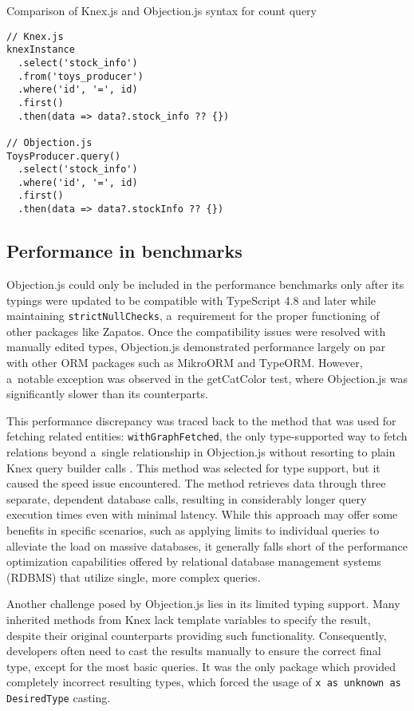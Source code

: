 \begin{listing}
\caption{Comparison of Knex.js and Objection.js syntax for count query}
\label{lst:knexObjection}
\begin{verbatim}
// Knex.js
knexInstance
  .select('stock_info')
  .from('toys_producer')
  .where('id', '=', id)
  .first()
  .then(data => data?.stock_info ?? {})

// Objection.js
ToysProducer.query()
  .select('stock_info')
  .where('id', '=', id)
  .first()
  .then(data => data?.stockInfo ?? {})
\end{verbatim}
\end{listing}

\subsection*{Performance in benchmarks}

Objection.js could only be included in the performance benchmarks only after its
typings were updated to be compatible with TypeScript 4.8 and later while
maintaining \texttt{strictNullChecks}, a~requirement for the proper functioning
of other packages like Zapatos. Once the compatibility issues were resolved with
manually edited types, Objection.js demonstrated performance largely on par with
other ORM packages such as MikroORM and TypeORM. However, a~notable exception
was observed in the getCatColor test, where Objection.js was significantly
slower than its counterparts.

\newpage

This performance discrepancy was traced back to the method that was used for
fetching related entities: \texttt{withGraphFetched}, the only type-supported
way to fetch relations beyond a~single relationship in Objection.js without
resorting to plain Knex query builder calls \cite{objectionDocs}. This method
was selected for type support, but it caused the speed issue encountered. The
method retrieves data through three separate, dependent database calls,
resulting in considerably longer query execution times even with minimal
latency. While this approach may offer some benefits in specific scenarios, such
as applying limits to individual queries to alleviate the load on massive
databases, it generally falls short of the performance optimization capabilities
offered by relational database management systems (RDBMS) that utilize single,
more complex queries.

Another challenge posed by Objection.js lies in its limited typing support. Many
inherited methods from Knex lack template variables to specify the result,
despite their original counterparts providing such functionality. Consequently,
developers often need to cast the results manually to ensure the correct final
type, except for the most basic queries. It was the only package which provided
completely incorrect resulting types, which forced the usage of \texttt{x as
unknown as DesiredType} casting.

